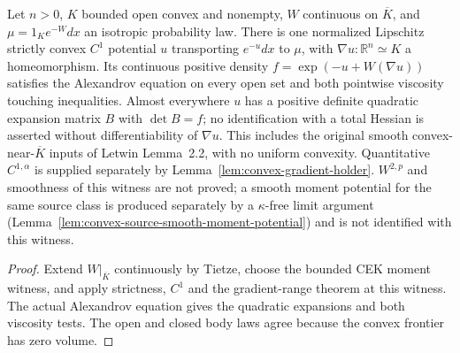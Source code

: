 \begin{lemma}
  \label{lem:convex-source-moment-equation}
  \leanok
  Let $n>0$, $K$ bounded open convex and nonempty, $W$ continuous on $\overline K$, and
  $\mu=1_K e^{-W}dx$ an isotropic probability law. There is one normalized Lipschitz
  strictly convex $C^1$ potential $u$ transporting $e^{-u}dx$ to $\mu$, with
  $\nabla u:\mathbb R^n\simeq K$ a homeomorphism. Its continuous positive density
  $f=\exp(-u+W(\nabla u))$ satisfies the Alexandrov equation on every open set and
  both pointwise viscosity touching inequalities. Almost everywhere $u$ has a positive
  definite quadratic expansion matrix $B$ with $\det B=f$; no identification with a
  total Hessian is asserted without differentiability of $\nabla u$.
  This includes the original smooth convex-near-$\overline K$ inputs of Letwin Lemma~2.2,
  with no uniform convexity. Quantitative $C^{1,\alpha}$ is supplied separately by
  Lemma~\ref{lem:convex-gradient-holder}. $W^{2,p}$ and smoothness of this witness are not proved;
  a smooth moment potential for the same source class is produced separately by a $\kappa$-free
  limit argument (Lemma~\ref{lem:convex-source-smooth-moment-potential}) and is not identified with this witness.
\end{lemma}
\begin{proof}
  \leanok
  Extend $W|_{\overline K}$ continuously by Tietze, choose the bounded CEK moment witness,
  and apply strictness, $C^1$ and the gradient-range theorem at this witness. The actual
  Alexandrov equation gives the quadratic expansions and both viscosity tests.
  The open and closed body laws agree because the convex frontier has zero volume.
\end{proof}

